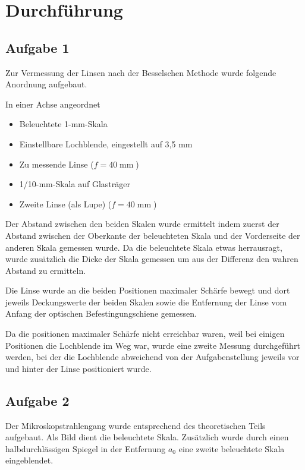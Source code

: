 \documentclass[a4paper,german,12pt,smallheadings]{scrartcl}
\begin{document}
\section{Durchführung}
\subsection{Aufgabe 1}
Zur Vermessung der Linsen nach der Besselschen Methode wurde folgende Anordnung
aufgebaut.

In einer Achse angeordnet
\begin{itemize}
  \item Beleuchtete 1-mm-Skala
  \item Einstellbare Lochblende, eingestellt auf 3{,}5 mm
  \item Zu messende Linse ($f = 40 \operatorname{mm}$)
  \item 1/10-mm-Skala auf Glasträger
  \item Zweite Linse (als Lupe) ($f = 40 \operatorname{mm}$)
\end{itemize}

Der Abstand zwischen den beiden Skalen wurde ermittelt indem zuerst der Abstand
zwischen der Oberkante der beleuchteten Skala und der Vorderseite der anderen
Skala gemessen wurde. Da die beleuchtete Skala etwas herrausragt, wurde
zusätzlich die Dicke der Skala gemessen um aus der Differenz den wahren Abstand
zu ermitteln.

Die Linse wurde an die beiden Positionen maximaler Schärfe bewegt und dort
jeweils Deckungswerte der beiden Skalen sowie die Entfernung der Linse vom
Anfang der optischen Befestingungschiene gemessen.

Da die positionen maximaler Schärfe nicht erreichbar waren, weil bei einigen
Positionen die Lochblende im Weg war, wurde eine zweite Messung durchgeführt
werden, bei der die Lochblende abweichend von der Aufgabenstellung jeweils vor
und hinter der Linse positioniert wurde.

\subsection{Aufgabe 2}

Der Mikroskopstrahlengang wurde entsprechend des theoretischen Teils aufgebaut.
Als Bild dient die beleuchtete Skala. Zusätzlich wurde durch einen
halbdurchlässigen Spiegel in der Entfernung $a_0$ eine zweite beleuchtete Skala
eingeblendet.
\end{document}
